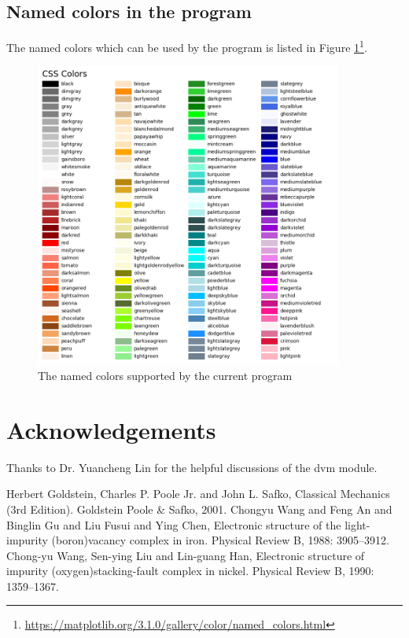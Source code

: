 \documentclass[12pt]{book}
\begin{document}
\section{\label{sec:supp}Named colors in the program}
The named colors which can be used by the program is listed in Figure \ref{fig:named_colors}\footnote{\url{https://matplotlib.org/3.1.0/gallery/color/named_colors.html}}.
\begin{figure}[htbp]
\centering
\includegraphics[width=0.9\textwidth]{named_colors.pdf}
\caption{The named colors supported by the current program}
\label{fig:named_colors}
\end{figure}



\chapter*{Acknowledgements}
Thanks to Dr. Yuancheng Lin for the helpful discussions of the dvm module.

\begin{thebibliography}{99}
 Herbert Goldstein, Charles P. Poole Jr. and John L. Safko, Classical Mechanics (3rd Edition). Goldstein Poole \& Safko, 2001.
 Chongyu Wang and Feng An and Binglin Gu and Liu Fusui and Ying Chen, Electronic structure of the light-impurity (boron){\textendash}vacancy complex in iron. Physical Review B, 1988: 3905--3912.
 Chong-yu Wang, Sen-ying Liu and Lin-guang Han, Electronic structure of impurity (oxygen){\textendash}stacking-fault complex in nickel. Physical Review B, 1990: 1359--1367.
\end{thebibliography}
\end{document}
